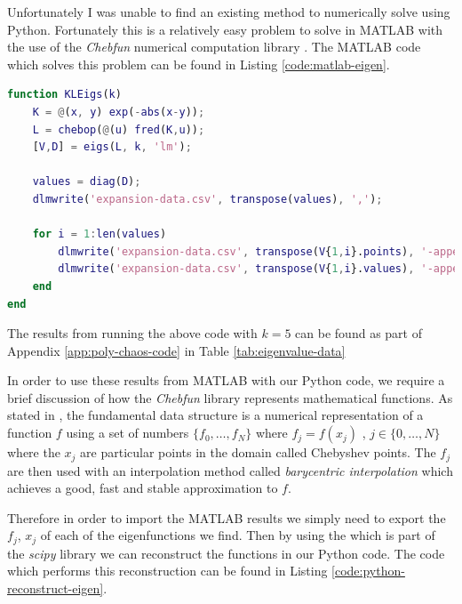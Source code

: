 Unfortunately I was unable to find an existing method to numerically solve
 using Python. Fortunately
this is a relatively easy problem to solve in MATLAB with the use of the
\textit{Chebfun} numerical computation library \cite{chebfun}. The MATLAB code
which solves this problem can be found in Listing \ref{code:matlab-eigen}.

\begin{lstlisting}[caption={MATLAB code which finds the first 5 eigenvalues and
                            associated eigenfunctions},
                   label={code:matlab-eigen},
                   language=MATLAB]
function KLEigs(k)
    K = @(x, y) exp(-abs(x-y));
    L = chebop(@(u) fred(K,u));
    [V,D] = eigs(L, k, 'lm');

    values = diag(D);
    dlmwrite('expansion-data.csv', transpose(values), ',');

    for i = 1:len(values)
        dlmwrite('expansion-data.csv', transpose(V{1,i}.points), '-append', 'delimiter', ',');
        dlmwrite('expansion-data.csv', transpose(V{1,i}.values), '-append', 'delimiter', ',');
    end
end
\end{lstlisting}

The results from running the above code with $k = 5$ can be found as part of
Appendix \ref{app:poly-chaos-code} in Table \ref{tab:eigenvalue-data}

In order to use these results from MATLAB with our Python
code, we require a brief discussion of how the \textit{Chebfun} library
represents mathematical functions. As stated in \cite{chebfun-data}, the
fundamental data structure  is a numerical representation of a
function $f$ using a set of numbers $\{f_0, \ldots, f_N\}$ where $f_j = f(x_j)$
, $j \in \{0, \ldots, N\}$ where the $x_j$ are particular points in the domain
called Chebyshev points. The $f_j$ are then used with an interpolation method
called \textit{barycentric interpolation} which achieves a good, fast and stable
approximation to $f$.

Therefore in order to import the  MATLAB results we simply need to
export the $f_j$, $x_j$ of each of the eigenfunctions we find. Then by using
the  which is part of the \textit{scipy} library
\cite{scipy} we can reconstruct the functions in our Python code. The code
which performs this reconstruction can be found in Listing
\ref{code:python-reconstruct-eigen}.

